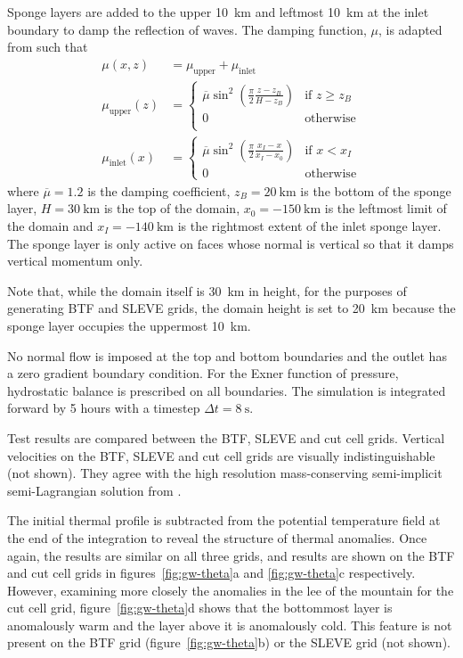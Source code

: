 \documentclass{ametsoc}
\begin{document}
Sponge layers are added to the upper \SI{10}{\kilo\meter} and leftmost \SI{10}{\kilo\meter} at the inlet boundary to damp the reflection of waves.
The damping function, \(\mu\), is adapted from \citet{melvin2010} such that
\begin{align}
	\mu(x, z) &= \mu_\mathrm{upper} + \mu_\mathrm{inlet} \\
	\mu_\mathrm{upper}(z) &= \begin{cases}
		\overline{\mu} \sin^2 \left( \frac{\pi}{2} \frac{z - z_B}{H - z_B} \right) & \text{if } z \geq z_B \\
		0 & \text{otherwise} \\
	\end{cases} \\
	\mu_\mathrm{inlet}(x) &= \begin{cases}
		\overline{\mu} \sin^2 \left( \frac{\pi}{2} \frac{x_I - x}{x_I - x_0} \right) & \text{if } x < x_I \\
		0 & \text{otherwise}
	\end{cases}
\end{align}
where $\overline{\mu} = 1.2$ is the damping coefficient, $z_B = \SI{20}{\kilo\meter}$ is the bottom of the sponge layer, $H = \SI{30}{\kilo\meter}$ is the top of the domain, $x_0 = \SI{-150}{\kilo\meter}$ is the leftmost limit of the domain and $x_I = \SI{-140}{\kilo\meter}$ is the rightmost extent of the inlet sponge layer.  The sponge layer is only active on faces whose normal is vertical so that it damps vertical momentum only.

Note that, while the domain itself is \SI{30}{\kilo\meter} in height, for the purposes of generating BTF and SLEVE grids, the domain height is set to \SI{20}{\kilo\meter} because the sponge layer occupies the uppermost \SI{10}{\kilo\meter}.

No normal flow is imposed at the top and bottom boundaries and the outlet has a zero gradient boundary condition.  For the Exner function of pressure, hydrostatic balance is prescribed on all boundaries.  The simulation is integrated forward by 5 hours with a timestep $\Delta t = \SI{8}{\second}$.

Test results are compared between the BTF, SLEVE and cut cell grids.  Vertical velocities on the BTF, SLEVE and cut cell grids are visually indistinguishable (not shown).  They agree with the high resolution mass-conserving semi-implicit semi-Lagrangian solution from \citet{melvin2010}.

The initial thermal profile is subtracted from the potential temperature field at the end of the integration to reveal the structure of thermal anomalies.  Once again, the results are similar on all three grids, and results are shown on the BTF and cut cell grids in figures~\ref{fig:gw-theta}a and \ref{fig:gw-theta}c respectively.  However, examining more closely the anomalies in the lee of the mountain for the cut cell grid, figure~\ref{fig:gw-theta}d shows that the bottommost layer is anomalously warm and the layer above it is anomalously cold.  This feature is not present on the BTF grid (figure~\ref{fig:gw-theta}b) or the SLEVE grid (not shown).  
\end{document}
